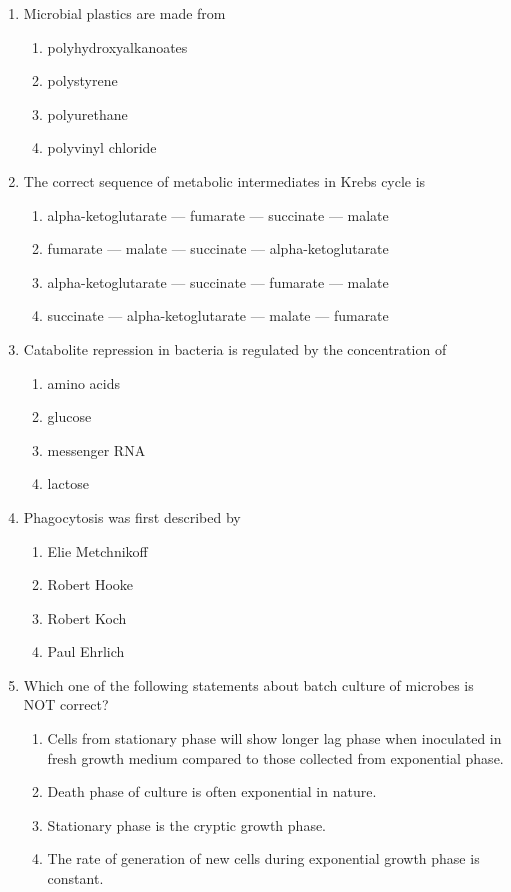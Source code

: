 \documentclass[journal,12pt,onecolumn]{IEEEtran}
\begin{document}
\begin{enumerate}
    \item Microbial plastics are made from
    \begin{enumerate}
        \item polyhydroxyalkanoates
        \item polystyrene
        \item polyurethane
        \item polyvinyl chloride
    \end{enumerate}

    \item The correct sequence of metabolic intermediates in Krebs cycle is
    \begin{enumerate}
        \item alpha-ketoglutarate --- fumarate --- succinate --- malate
        \item fumarate --- malate --- succinate --- alpha-ketoglutarate
        \item alpha-ketoglutarate --- succinate --- fumarate --- malate
        \item succinate --- alpha-ketoglutarate --- malate --- fumarate
    \end{enumerate}

    \item Catabolite repression in bacteria is regulated by the concentration of
    \begin{enumerate}
        \item amino acids
        \item glucose
        \item messenger RNA
        \item lactose
    \end{enumerate}

    \item Phagocytosis was first described by
    \begin{enumerate}
        \item Elie Metchnikoff
        \item Robert Hooke
        \item Robert Koch
        \item Paul Ehrlich
    \end{enumerate}

    \item Which one of the following statements about batch culture of microbes is NOT correct?
    \begin{enumerate}
        \item Cells from stationary phase will show longer lag phase when inoculated in fresh growth medium compared to those collected from exponential phase.
        \item Death phase of culture is often exponential in nature.
        \item Stationary phase is the cryptic growth phase.
        \item The rate of generation of new cells during exponential growth phase is constant.
    \end{enumerate}


\end{enumerate}
\end{document}

